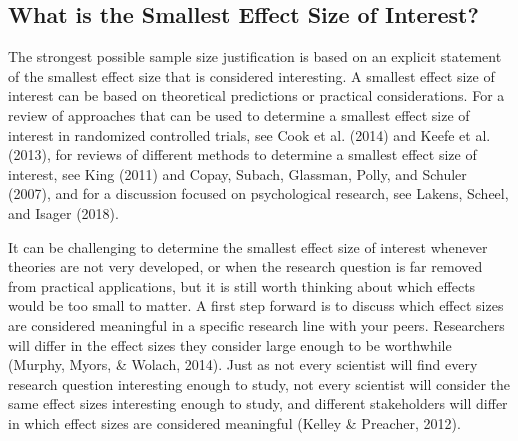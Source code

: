 \documentclass[
  english,
  ,jou, a4paper,floatsintext]{apa6}
\begin{document}
\hypertarget{what-is-the-smallest-effect-size-of-interest}{%
\subsection{What is the Smallest Effect Size of Interest?}\label{what-is-the-smallest-effect-size-of-interest}}

The strongest possible sample size justification is based on an explicit statement of the smallest effect size that is considered interesting. A smallest effect size of interest can be based on theoretical predictions or practical considerations. For a review of approaches that can be used to determine a smallest effect size of interest in randomized controlled trials, see Cook et al. (2014) and Keefe et al. (2013), for reviews of different methods to determine a smallest effect size of interest, see King (2011) and Copay, Subach, Glassman, Polly, and Schuler (2007), and for a discussion focused on psychological research, see Lakens, Scheel, and Isager (2018).

It can be challenging to determine the smallest effect size of interest whenever theories are not very developed, or when the research question is far removed from practical applications, but it is still worth thinking about which effects would be too small to matter. A first step forward is to discuss which effect sizes are considered meaningful in a specific research line with your peers. Researchers will differ in the effect sizes they consider large enough to be worthwhile (Murphy, Myors, \& Wolach, 2014). Just as not every scientist will find every research question interesting enough to study, not every scientist will consider the same effect sizes interesting enough to study, and different stakeholders will differ in which effect sizes are considered meaningful (Kelley \& Preacher, 2012).
\end{document}

